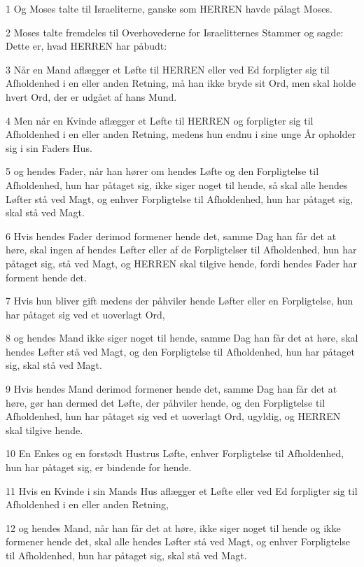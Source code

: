 \par 1 Og Moses talte til Israeliterne, ganske som HERREN havde pålagt Moses.
\par 2 Moses talte fremdeles til Overhovederne for Israelitternes Stammer og sagde: Dette er, hvad HERREN har påbudt:
\par 3 Når en Mand aflægger et Løfte til HERREN eller ved Ed forpligter sig til Afholdenhed i en eller anden Retning, må han ikke bryde sit Ord, men skal holde hvert Ord, der er udgået af hans Mund.
\par 4 Men når en Kvinde aflægger et Løfte til HERREN og forpligter sig til Afholdenhed i en eller anden Retning, medens hun endnu i sine unge År opholder sig i sin Faders Hus.
\par 5 og hendes Fader, når han hører om hendes Løfte og den Forpligtelse til Afholdenhed, hun har påtaget sig, ikke siger noget til hende, så skal alle hendes Løfter stå ved Magt, og enhver Forpligtelse til Afholdenhed, hun har påtaget sig, skal stå ved Magt.
\par 6 Hvis hendes Fader derimod formener hende det, samme Dag han får det at høre, skal ingen af hendes Løfter eller af de Forpligtelser til Afholdenhed, hun har påtaget sig, stå ved Magt, og HERREN skal tilgive hende, fordi hendes Fader har forment hende det.
\par 7 Hvis hun bliver gift medens der påhviler hende Løfter eller en Forpligtelse, hun har påtaget sig ved et uoverlagt Ord,
\par 8 og hendes Mand ikke siger noget til hende, samme Dag han får det at høre, skal hendes Løfter stå ved Magt, og den Forpligtelse til Afholdenhed, hun har påtaget sig, skal stå ved Magt.
\par 9 Hvis hendes Mand derimod formener hende det, samme Dag han får det at høre, gør han dermed det Løfte, der påhviler hende, og den Forpligtelse til Afholdenhed, hun har påtaget sig ved et uoverlagt Ord, ugyldig, og HERREN skal tilgive hende.
\par 10 En Enkes og en forstødt Hustrus Løfte, enhver Forpligtelse til Afholdenhed, hun har påtaget sig, er bindende for hende.
\par 11 Hvis en Kvinde i sin Mands Hus aflægger et Løfte eller ved Ed forpligter sig til Afholdenhed i en eller anden Retning,
\par 12 og hendes Mand, når han får det at høre, ikke siger noget til hende og ikke formener hende det, skal alle hendes Løfter stå ved Magt, og enhver Forpligtelse til Afholdenhed, hun har påtaget sig, skal stå ved Magt.
